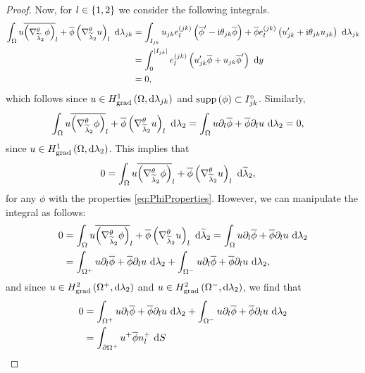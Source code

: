 \documentclass[11pt]{report}
\newcommand{\tlambda}{\widetilde{\lambda}}
\begin{document}
\begin{proof}
	Now, for $l\in\left\{ 1,2 \right\}$ we consider the following integrals.
	\begin{align*}
		\integral{\ddom}{ u\overline{\bracs{\tgrad_{\tlambda_2}\phi}}_l + \overline{\phi}\bracs{\tgrad_{\tlambda_2}u}_l }{\lambda_{jk}}
		&= \integral{I_{jk}}{ u_{jk}e^{(jk)}_l\bracs{\overline{\phi}' - \rmi\qm_{jk}\overline{\phi}} + \overline{\phi}e^{(jk)}_l\bracs{u_{jk}' + \rmi\qm_{jk}u_{jk}} }{\lambda_{jk}} \\
		&= \int_0^{\abs{I_{jk}}} e^{(jk)}_l \bracs{ u_{jk}'\overline{\phi} + u_{jk}\overline{\phi}' } \ \md y \\
		&= 0,
	\end{align*}
	which follows since $u\in H^1_\mathrm{grad}\left( \Omega, \mathrm{d}\lambda_{jk} \right)$ and $\mathrm{supp}\left( \phi \right)\subset I_{jk}^\circ$.
	Similarly, 
	\begin{align*}
		\integral{\ddom}{ u\overline{\bracs{\tgrad_{\tlambda_2}\phi}}_l + \overline{\phi}\bracs{\tgrad_{\tlambda_2}u}_l }{\lambda_2}
		&= \integral{\ddom}{ u\partial_l\overline{\phi} + \overline{\phi}\partial_l u }{\lambda_2}
		= 0,
	\end{align*}
	since $u\in H^1_\mathrm{grad}\left( \Omega, \mathrm{d}\lambda_2 \right)$.
	This implies that
	\begin{align*}
		0 &= \integral{\ddom}{ u\overline{\bracs{\tgrad_{\tlambda_2}\phi}}_l + \overline{\phi}\bracs{\tgrad_{\tlambda_2}u}_l }{\tlambda_2},
	\end{align*}
	for any $\phi$ with the properties \eqref{eq:PhiProperties}.
	However, we can manipulate the integral as follows:
	\begin{align*}
		0 &= \integral{\ddom}{ u\overline{\bracs{\tgrad_{\tlambda_2}\phi}}_l + \overline{\phi}\bracs{\tgrad_{\tlambda_2}u}_l }{\tlambda_2}
		= \integral{\ddom}{ u\partial_l\overline{\phi} + \overline{\phi}\partial_l u }{\lambda_2} \\
		&= \integral{\ddom^+}{ u\partial_l\overline{\phi} + \overline{\phi}\partial_l u }{\lambda_2} 
		+ \integral{\ddom^-}{ u\partial_l\overline{\phi} + \overline{\phi}\partial_l u }{\lambda_2},
	\end{align*}
	and since $u\in H^2_{\mathrm{grad}}\left( \Omega^+,\mathrm{d}\lambda_2 \right)$ and $u\in H^2_{\mathrm{grad}}\left( \Omega^-,\mathrm{d}\lambda_2 \right)$, we find that
	\begin{align*}
		0 &= \integral{\ddom^+}{ u\partial_l\overline{\phi} + \overline{\phi}\partial_l u }{\lambda_2} 
		+ \integral{\ddom^-}{ u\partial_l\overline{\phi} + \overline{\phi}\partial_l u }{\lambda_2} \\
		&= \integral{\partial\ddom^+}{ u^+\overline{\phi}n^+_l }{S}

\end{align*}
\end{proof}
\end{document}

